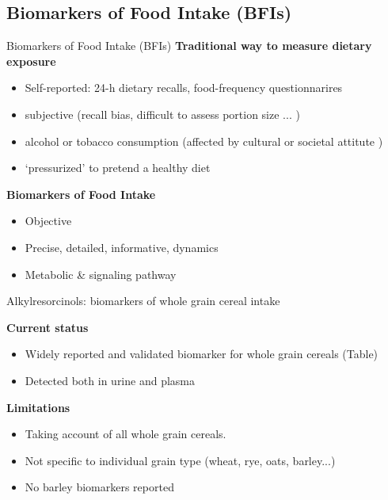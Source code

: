 \documentclass{beamer}
\begin{document}
\subsection {Biomarkers of Food Intake (BFIs)}
\begin{frame}{Biomarkers of Food Intake (BFIs)}
\textbf{Traditional way to measure dietary exposure}
\begin{itemize}
  \item Self-reported: 24-h dietary recalls, food-frequency questionnarires
  \item subjective (recall bias, difficult to assess portion size ... )
  \item alcohol or tobacco consumption (affected by cultural or societal attitute )
  \item `pressurized' to pretend a healthy diet
\end{itemize}

\textbf{Biomarkers of Food Intake}
\begin{itemize}
  \item Objective
  \item Precise, detailed, informative, dynamics
  \item Metabolic \& signaling pathway
\end{itemize}
\end{frame}

\begin{frame}{Alkylresorcinols: biomarkers of whole grain cereal intake}

\textbf{Current status}
\begin{itemize}
	\item Widely reported and validated biomarker for whole grain cereals (Table)
	\item Detected both in urine and plasma
\end{itemize}

\textbf{Limitations}
\begin{itemize}
	\item Taking account of all whole grain cereals. 
	\item Not specific to individual grain type (wheat, rye, oats, barley...)
	\item No barley biomarkers reported
\end{itemize}
\end{frame}

\end{document}
